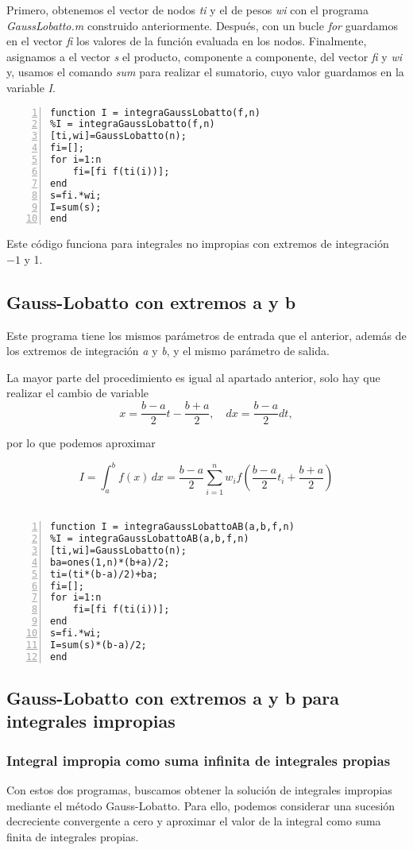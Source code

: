 \documentclass[a4paper]{article}
\begin{document}
Primero, obtenemos el vector de nodos \textit{ti} y el de pesos \textit{wi} con el programa \textit{GaussLobatto.m} construido anteriormente. Después, con un bucle \textit{for} guardamos en el vector \textit{fi} los valores de la función evaluada en los nodos. Finalmente, asignamos a el vector \textit{s} el producto, componente a componente, del vector \textit{fi} y \textit{wi} y, usamos el comando \textit{sum} para realizar el sumatorio, cuyo valor guardamos en la variable \textit{I}.
\begin{lstlisting}[frame=single, numbers=left, style=Matlab-Pyglike]
function I = integraGaussLobatto(f,n)
%I = integraGaussLobatto(f,n)
[ti,wi]=GaussLobatto(n);
fi=[];
for i=1:n
    fi=[fi f(ti(i))];
end
s=fi.*wi;
I=sum(s);
end
\end{lstlisting}

Este código funciona para integrales no impropias con extremos de integración $-1$ y 1.

\subsection{Gauss-Lobatto con extremos a y b}
Este programa tiene los mismos parámetros de entrada que el anterior, además de los extremos de integración \textit{a} y \textit{b}, y el mismo parámetro de salida.

La mayor parte del procedimiento es igual al apartado anterior, solo hay que realizar el cambio de variable
\[x=\frac{b-a}{2}t-\frac{b+a}{2},\quad dx=\frac{b-a}{2}dt,\]

por lo que podemos aproximar

\[\displaystyle I=\int_{a}^{b} \! f(x)  \,dx = \frac{b-a}{2} \sum_{i=1}^{n}w_i f \left(\frac{b-a}{2}t_i + \frac{b+a}{2} \right)\]
\\
\begin{lstlisting}[frame=single, numbers=left, style=Matlab-Pyglike]
function I = integraGaussLobattoAB(a,b,f,n)
%I = integraGaussLobattoAB(a,b,f,n)
[ti,wi]=GaussLobatto(n);
ba=ones(1,n)*(b+a)/2;
ti=(ti*(b-a)/2)+ba;
fi=[];
for i=1:n
    fi=[fi f(ti(i))];
end
s=fi.*wi;
I=sum(s)*(b-a)/2;
end
\end{lstlisting}

\subsection{Gauss-Lobatto con extremos a y b para integrales impropias}

\subsubsection{Integral impropia como suma infinita de integrales propias}
Con estos dos programas, buscamos obtener la solución de integrales impropias mediante el método Gauss-Lobatto. Para ello,  podemos considerar una sucesión decreciente convergente a cero y aproximar el valor de la integral como suma
 finita de integrales propias.
 
\end{document}

